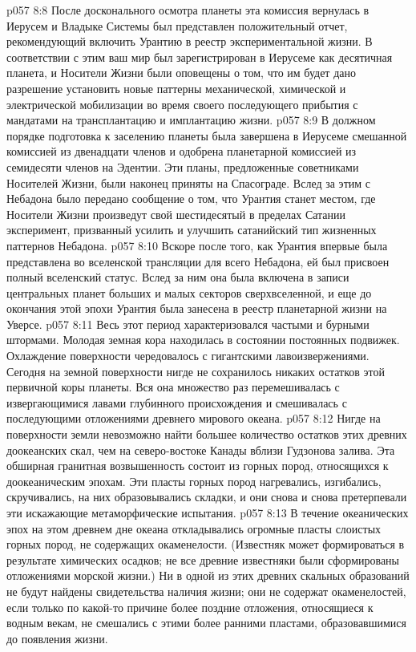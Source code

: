 \vs p057 8:8 После досконального осмотра планеты эта комиссия вернулась в Иерусем и Владыке Системы был представлен положительный отчет, рекомендующий включить Урантию в реестр экспериментальной жизни. В соответствии с этим ваш мир был зарегистрирован в Иерусеме как десятичная планета, и Носители Жизни были оповещены о том, что им будет дано разрешение установить новые паттерны механической, химической и электрической мобилизации во время своего последующего прибытия с мандатами на трансплантацию и имплантацию жизни.
\vs p057 8:9 В должном порядке подготовка к заселению планеты была завершена в Иерусеме смешанной комиссией из двенадцати членов и одобрена планетарной комиссией из семидесяти членов на Эдентии. Эти планы, предложенные советниками Носителей Жизни, были наконец приняты на Спасограде. Вслед за этим с Небадона было передано сообщение о том, что Урантия станет местом, где Носители Жизни произведут свой шестидесятый в пределах Сатании эксперимент, призванный усилить и улучшить сатанийский тип жизненных паттернов Небадона.
\vs p057 8:10 Вскоре после того, как Урантия впервые была представлена во вселенской трансляции для всего Небадона, ей был присвоен полный вселенский статус. Вслед за ним она была включена в записи центральных планет больших и малых секторов сверхвселенной, и еще до окончания этой эпохи Урантия была занесена в реестр планетарной жизни на Уверсе.
\vs p057 8:11 \pc Весь этот период характеризовался частыми и бурными штормами. Молодая земная кора находилась в состоянии постоянных подвижек. Охлаждение поверхности чередовалось с гигантскими лавоизвержениями. Сегодня на земной поверхности нигде не сохранилось никаких остатков этой первичной коры планеты. Вся она множество раз перемешивалась с извергающимися лавами глубинного происхождения и смешивалась с последующими отложениями древнего мирового океана.
\vs p057 8:12 Нигде на поверхности земли невозможно найти большее количество остатков этих древних доокеанских скал, чем на северо\hyp{}востоке Канады вблизи Гудзонова залива. Эта обширная гранитная возвышенность состоит из горных пород, относящихся к доокеаническим эпохам. Эти пласты горных пород нагревались, изгибались, скручивались, на них образовывались складки, и они снова и снова претерпевали эти искажающие метаморфические испытания.
\vs p057 8:13 В течение океанических эпох на этом древнем дне океана откладывались огромные пласты слоистых горных пород, не содержащих окаменелости. (Известняк может формироваться в результате химических осадков; не все древние известняки были сформированы отложениями морской жизни.) Ни в одной из этих древних скальных образований не будут найдены свидетельства наличия жизни; они не содержат окаменелостей, если только по какой\hyp{}то причине более поздние отложения, относящиеся к водным векам, не смешались с этими более ранними пластами, образовавшимися до появления жизни.
